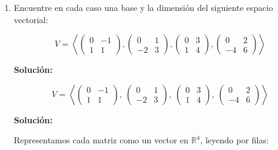 \documentclass[a4paper]{article}
\begin{document}
\begin{enumerate}
\begin{enumerate}
    3. Sustituimos \(a\) en la tercera:
    \[
    15 - 7c + 5c = 11 \Rightarrow -2c = -4 \Rightarrow c = 2
    \]

    Luego:
    \[
    b = 3 - 3(2) = -3,\quad a = 15 - 7(2) = 1
    \]

    \textbf{Conclusión:}
    \[
    \vec{v} = a \vec{v}_1 + b \vec{v}_2 + c \vec{v}_3 = \vec{v}_1 - 3\vec{v}_2 + 2\vec{v}_3
    \]
\end{enumerate}

\newpage
\item

Encuentre en cada caso una base y la dimensión del siguiente espacio vectorial:

\[
V = \left\langle
\begin{pmatrix} 0 & -1 \\ 1 & 1 \end{pmatrix},
\begin{pmatrix} 0 & 1 \\ -2 & 3 \end{pmatrix},
\begin{pmatrix} 0 & 3 \\ 1 & 4 \end{pmatrix},
\begin{pmatrix} 0 & 2 \\ -4 & 6 \end{pmatrix}
\right\rangle
\]

\textbf{Solución:}

\[
V = \left\langle
\begin{pmatrix} 0 & -1 \\ 1 & 1 \end{pmatrix},\ 
\begin{pmatrix} 0 & 1 \\ -2 & 3 \end{pmatrix},\ 
\begin{pmatrix} 0 & 3 \\ 1 & 4 \end{pmatrix},\ 
\begin{pmatrix} 0 & 2 \\ -4 & 6 \end{pmatrix}
\right\rangle
\]

\textbf{Solución:}

Representamos cada matriz como un vector en \(\mathbb{R}^4\), leyendo por filas:


\end{enumerate}
\end{document}
